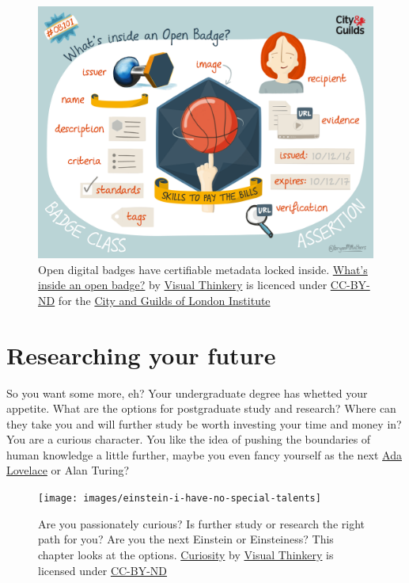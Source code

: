 \documentclass[
]{book}
\begin{document}
\begin{figure}

{\centering \includegraphics[width=1\linewidth]{images/skills-to-pay-the-bills} 

}

\caption{Open digital badges have certifiable metadata locked inside. \href{https://bryanmmathers.com/whats-inside-an-open-badge/}{What's inside an open badge?} by \href{https://visualthinkery.com/}{Visual Thinkery} is licenced under \href{https://creativecommons.org/licenses/by-nd/4.0/}{CC-BY-ND} for the \href{https://en.wikipedia.org/wiki/City_and_Guilds_of_London_Institute}{City and Guilds of London Institute}}\label{fig:skills-bills-fig}
\end{figure}



\hypertarget{researching}{%
\chapter{Researching your future}\label{researching}}

So you want some more, eh? Your undergraduate degree has whetted your appetite. What are the options for postgraduate study and research? Where can they take you and will further study be worth investing your time and money in? You are a curious character. You like the idea of pushing the boundaries of human knowledge a little further, maybe you even fancy yourself as the next \href{https://en.wikipedia.org/wiki/Ada_Lovelace}{Ada Lovelace} or Alan Turing? 👩‍🔬👨‍🔬

\begin{figure}

{\centering \texttt{[image: images/einstein-i-have-no-special-talents]} 

}

\caption{Are you passionately curious? Is further study or research the right path for you? Are you the next Einstein or Einsteiness? This chapter looks at the options. \href{https://bryanmmathers.com/curiosity/}{Curiosity} by \href{https://visualthinkery.com/}{Visual Thinkery} is licensed under \href{https://creativecommons.org/licenses/by-nd/4.0/}{CC-BY-ND}}\label{fig:einstein-fig}
\end{figure}
\end{document}
